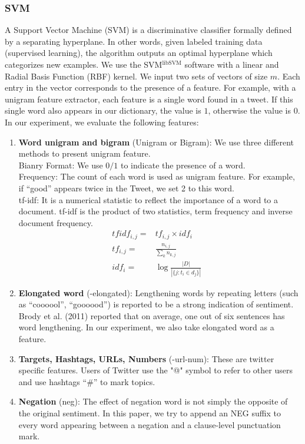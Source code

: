 \subsubsection{SVM}
\label{svm}
A Support Vector Machine (SVM) is a discriminative classifier formally defined by a separating hyperplane. In other words, given labeled training data (supervised learning), the algorithm outputs an optimal hyperplane which categorizes new examples. We use the SVM$^{\text{libSVM}}$ software with a linear and Radial Basis Function (RBF) kernel. We input two sets of vectors of size $m$. Each entry in the vector corresponds to the presence of a feature. For example, with a unigram feature extractor, each feature is a single word found in a tweet. If this single word also appears in our dictionary, the value is $1$, otherwise the value is $0$. In our experiment, we evaluate the following features:
\begin{enumerate}
\item \textbf{Word unigram and bigram} (Unigram or Bigram): We use three different methods to present unigram feature. \\
 Bianry Format: We use $0/1$ to indicate the presence of a word.\\ 
 Frequency: The count of each word is used as unigram feature. For example, if “good” appears twice in the Tweet, we set 2 to this word.\\
 tf-idf: It is a numerical statistic to reflect the importance of a word to a document. tf-idf is the product of two statistics, term frequency and inverse document frequency. 
  \begin{eqnarray}
      tfidf_{i,j} = & tf_{i,j} \times idf_{i} &  \\
      tf_{i,j} = & \frac{n_{i,j}}{\sum_k n_{k,j}} & \\
      idf_i = & \log \frac{|D|}{|\{j: t_i \in d_j\}|} &
  \end{eqnarray}   
  	\item \textbf{Elongated word} (-elongated): Lengthening words by repeating letters (such as “coooool”, “goooood”) is reported to be a strong indication of sentiment. Brody et al. (2011) reported that on average, one out of six sentences has word lengthening. In our experiment, we also take elongated word as a feature. 
   \item \textbf{Targets, Hashtags, URLs, Numbers} (-url-num): These are twitter specific features. Users of Twitter use the "@" symbol to refer to other users and use hashtags “\#” to mark topics. 
   \item \textbf{Negation} (neg): The effect of negation word is not simply the opposite of the original sentiment. In this paper, we try to append an NEG suffix to every word appearing between a negation and a clause-level punctuation mark. 
  
\end{enumerate}


